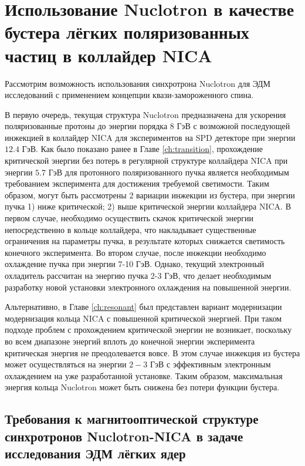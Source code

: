 	\section{Использование Nuclotron в качестве бустера лёгких поляризованных частиц в коллайдер NICA}\label{sec:EDM/nuclotron}

\par Рассмотрим возможность использования синхротрона Nuclotron для ЭДМ исследований с применением концепции квази-замороженного спина.
\par В первую очередь, текущая структура Nuclotron предназначена для ускорения поляризованные протоны до энергии порядка $8$ ГэВ с возможной последующей инжекцией в коллайдер NICA для экспериментов на SPD детекторе при энергии $12.4$ ГэВ. Как было показано ранее в Главе \ref{ch:transition}, прохождение критической энергии без потерь в регулярной структуре коллайдера NICA при энергии $5.7$ ГэВ для протонного поляризованного пучка является необходимым требованием эксперимента для достижения требуемой светимости. Таким образом, могут быть рассмотрены 2 вариации инжекции из бустера, при энергии пучка 1) ниже критической; 2) выше критической энергии коллайдера NICA. В первом случае, необходимо осуществить скачок критической энергии непосредственно в кольце коллайдера, что накладывает существенные ограничения на параметры пучка, в результате которых снижается светимость конечного эксперимента. Во втором случае, после инжекции необходимо охлаждение пучка при энергии 7-10 ГэВ. Однако, текущий электронный охладитель рассчитан на энергию пучка 2-3 ГэВ, что делает необходимым разработку новой установки электронного охлаждения на повышенной энергии.

\par Альтернативно, в Главе \ref{ch:resonant} был представлен вариант модернизации модернизация кольца NICA с повышенной критической энергией. При таком подходе проблем с прохождением критической энергии не возникает, поскольку во всем диапазоне энергий вплоть до конечной энергии эксперимента критическая энергия не преодолевается вовсе. В этом случае инжекция из бустера может осуществляться на энергии $2-3$ ГэВ с эффективным электронным охлаждением на уже разработанной установке. Таким образом, максимальная энергия кольца Nuclotron может быть снижена без потери функции бустера.

	\subsection{Требования к магнитооптической структуре синхротронов Nuclotron-NICA в задаче исследования ЭДМ лёгких ядер}\label{sec:EDM/requirements}

